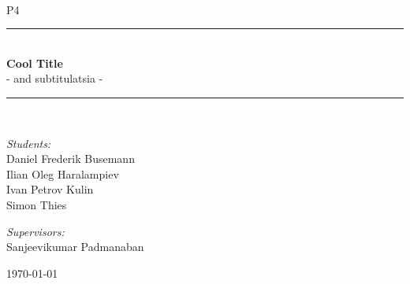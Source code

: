 \newcommand{\HRule}{\rule{\linewidth}{0.5 mm}}
\begin{titlepage}

\begin{center}
\\[0.5cm]

\textsc{\Large P4}\\[0.6cm]

\HRule \\[0.8cm]
{ \Huge \bfseries  Cool Title}\\[0.4cm]

  \Large{ - and subtitulatsia -
  }
\HRule \\[1.2cm]

\begin{minipage}{0.49\textwidth}
\begin{flushleft} \large
\emph{Students:}\\
Daniel Frederik Busemann\\
Ilian Oleg Haralampiev\\
Ivan Petrov Kulin\\
Simon Thies\\
\end{flushleft}
\end{minipage}
\begin{minipage}{0.49\textwidth}
\begin{flushright} \large
\emph{Supervisors:} \\
Sanjeevikumar Padmanaban
\end{flushright}
\end{minipage}

\vfill

{\large \today}



\end{center}

\end{titlepage}
